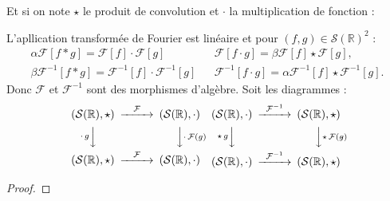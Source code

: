 Et si on note $\star$ le produit de convolution et $\cdot$ la multiplication de fonction :  
    \begin{Theo} L'apllication transformée de Fourier est linéaire et pour $(f,g) \in \mathcal{S}(\mathbb R)^2 $ : 
    \begin{eqnarray}
        \alpha \mathcal F[ f \ast g ]  =  \mathcal F[ f ]  \cdot \mathcal F[ g ]   & &  \mathcal F[ f \cdot  g ] = \beta  \mathcal F[ f ]  \star \mathcal F[ g ], \\
         \beta  \mathcal F^{-1}[ f \ast g ]  =  \mathcal F^{-1}[ f ]  \cdot \mathcal F^{-1} [ g ] & & \mathcal F^{-1}[ f \cdot  g ] = \alpha   \mathcal F^{-1}[ f ]  \star \mathcal F^{-1}[ g ].
    \end{eqnarray}
    Donc $\mathcal F$ et $\mathcal F^{-1}$ sont des morphismes d'algèbre.
    Soit les diagrammes :
    \begin{eqnarray}
        \begin{CD}
            (\mathcal{S}(\mathbb R), \star)
            @>\mathcal F>>
            (\mathcal{S}(\mathbb R), \cdot) \\
            @V{\cdot\, g}VV
            @VV{\cdot\, \mathcal F(g)}V \\
            (\mathcal{S}(\mathbb R), \star)
            @>\mathcal F>>
            (\mathcal{S}(\mathbb R), \cdot)
        \end{CD}
        &&
        \begin{CD}
            (\mathcal{S}(\mathbb R), \cdot)
            @>\mathcal F^{-1}>>
            (\mathcal{S}(\mathbb R), \star) \\
            @V{\star\, g}VV
            @VV{\star\, \mathcal F(g)}V \\
            (\mathcal{S}(\mathbb R), \cdot)
            @>\mathcal F^{-1}>>
            (\mathcal{S}(\mathbb R), \star)
        \end{CD}.
    \end{eqnarray}
\end{Theo}
\begin{proof}
    
\end{proof}

